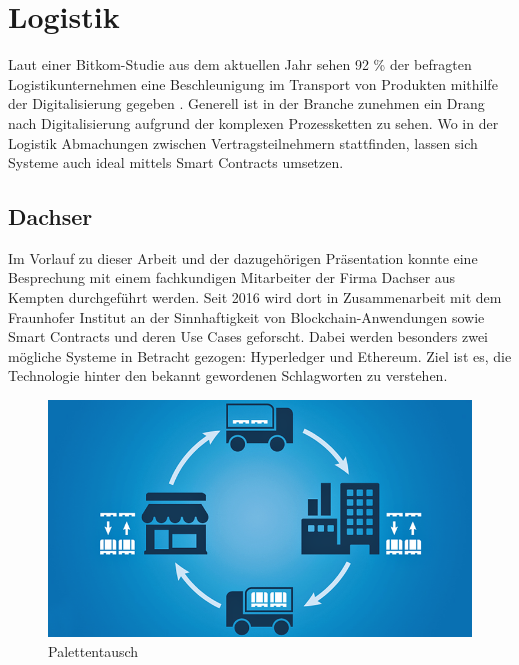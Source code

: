 \chapter{Logistik}
\label{chap:Logistik}
Laut einer Bitkom-Studie aus dem aktuellen Jahr sehen 92 \% der befragten Logistikunternehmen eine Beschleunigung im Transport von Produkten mithilfe der Digitalisierung gegeben \cite{Bitkom2019}. Generell ist in der Branche zunehmen ein Drang nach Digitalisierung aufgrund der komplexen Prozessketten zu sehen. Wo in der Logistik Abmachungen zwischen Vertragsteilnehmern stattfinden, lassen sich Systeme auch ideal mittels Smart Contracts umsetzen. 

\section{Dachser}
Im Vorlauf zu dieser Arbeit und der dazugehörigen Präsentation konnte eine Besprechung mit einem fachkundigen Mitarbeiter der Firma Dachser aus Kempten durchgeführt werden. Seit 2016 wird dort in Zusammenarbeit mit dem Fraunhofer Institut an der Sinnhaftigkeit von Blockchain-Anwendungen sowie Smart Contracts und deren Use Cases geforscht. Dabei werden besonders zwei mögliche Systeme in Betracht gezogen: Hyperledger und Ethereum. Ziel ist es, die Technologie hinter den bekannt gewordenen Schlagworten zu verstehen.

\begin{figure}[h!]
  \centering
  \includegraphics[width=\textwidth]{Bilder/Palettentausch.png}
  \caption[Palettentausch]{Palettentausch \cite{Disponaut2016}}
  \label{fig:palettentausch}
\end{figure}

